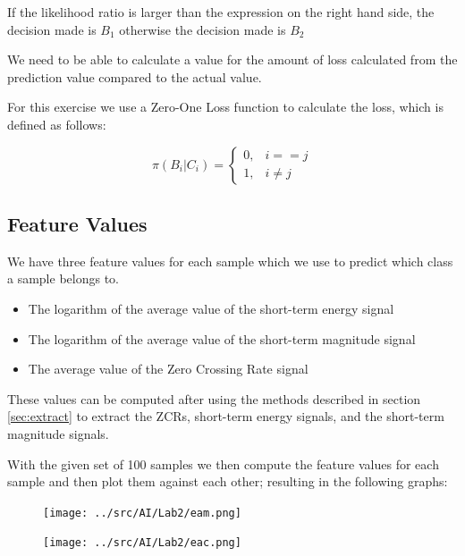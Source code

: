 \documentclass[a4paper]{article}
\begin{document}
If the likelihood ratio is larger than the expression on the right hand side, the decision made is $B_1$ otherwise
the decision made is $B_2$

We need to be able to calculate a value for the amount of loss calculated
from the prediction value compared to the actual value.

For this exercise we use a Zero-One Loss function to calculate the loss, which is defined as follows:

\begin{equation}
\pi(B_i|C_i) =  
    \begin{cases}
        0, & i == j \\
        1, & i \neq j
     \end{cases}
\end{equation}



\subsection{Feature Values}

We have three feature values for each sample which we use to predict which class a sample belongs to.
\begin{itemize}
\item The logarithm of the average value of the short-term energy signal
\item The logarithm of the average value of the short-term magnitude signal
\item The average value of the Zero Crossing Rate signal
\end{itemize}

These values can be computed after using the methods described in section \ref{sec:extract}
to extract the ZCRs, short-term energy signals, and the short-term magnitude signals.

With the given set of 100 samples we then compute the feature values for each sample
and then plot them against each other; resulting in the following graphs:

\begin{figure}[H]
\begin{center}
\texttt{[image: ../src/AI/Lab2/eam.png]}
\label{plot1}
\end{center}
\end{figure}


\begin{figure}[H]
\begin{center}
\texttt{[image: ../src/AI/Lab2/eac.png]}
\label{plot2}
\end{center}
\end{figure}
\end{document}
